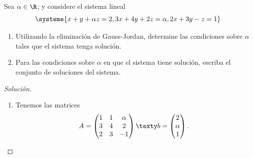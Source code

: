\documentclass[a4,11pt]{aleph-notas}
\begin{document}
\begin{ejer}
    Sea $\alpha \in \R$; y considere el sistema lineal
    \[
        \systeme{x+y+\alpha z=2, 3x+4y+2z=\alpha, 2x+3y-z=1}
    \]
    \begin{enumerate}
        \item Utilizando la eliminación de Gauss-Jordan, determine las condiciones sobre $\alpha$ tales que el sistema tenga solución.
        \item Para las condiciones sobre $\alpha$ en que el sistema tiene solución, escriba el conjunto de soluciones del sistema.
    \end{enumerate}
\end{ejer}

\begin{proof}[Solución]\hspace{0pt}
    \begin{enumerate}
    \item 
        Tenemos las matrices
        \[
            A = \begin{pmatrix}
            1&1&\alpha\\3&4&2\\2&3&-1
            \end{pmatrix}
            \texty
            b = \begin{pmatrix}
            2 \\ \alpha\\ 1
            \end{pmatrix}.
        \]


\end{enumerate}
\end{proof}
\end{document}

